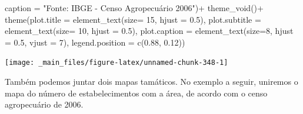 \documentclass[
  brazilian,
]{book}
\newenvironment{Shaded}{\begin{snugshade}}{\end{snugshade}}
\newcommand{\AttributeTok}[1]{\textcolor[rgb]{0.77,0.63,0.00}{#1}}
\newcommand{\DecValTok}[1]{\textcolor[rgb]{0.00,0.00,0.81}{#1}}
\newcommand{\FloatTok}[1]{\textcolor[rgb]{0.00,0.00,0.81}{#1}}
\newcommand{\FunctionTok}[1]{\textcolor[rgb]{0.00,0.00,0.00}{#1}}
\newcommand{\NormalTok}[1]{#1}
\newcommand{\SpecialCharTok}[1]{\textcolor[rgb]{0.00,0.00,0.00}{#1}}
\newcommand{\StringTok}[1]{\textcolor[rgb]{0.31,0.60,0.02}{#1}}
\begin{document}
\begin{Shaded}
\begin{Highlighting}[]
       \AttributeTok{caption =} \StringTok{"Fonte: IBGE {-} Censo Agropecuário 2006"}\NormalTok{)}\SpecialCharTok{+}
  \FunctionTok{theme\_void}\NormalTok{()}\SpecialCharTok{+}
  \FunctionTok{theme}\NormalTok{(}\AttributeTok{plot.title =} \FunctionTok{element\_text}\NormalTok{(}\AttributeTok{size=} \DecValTok{15}\NormalTok{, }\AttributeTok{hjust =} \FloatTok{0.5}\NormalTok{),}
        \AttributeTok{plot.subtitle =} \FunctionTok{element\_text}\NormalTok{(}\AttributeTok{size=} \DecValTok{10}\NormalTok{, }\AttributeTok{hjust =} \FloatTok{0.5}\NormalTok{),}
        \AttributeTok{plot.caption =} \FunctionTok{element\_text}\NormalTok{(}\AttributeTok{size=}\DecValTok{8}\NormalTok{, }\AttributeTok{hjust =} \FloatTok{0.5}\NormalTok{, }\AttributeTok{vjust =} \DecValTok{7}\NormalTok{),}
        \AttributeTok{legend.position =} \FunctionTok{c}\NormalTok{(}\FloatTok{0.88}\NormalTok{, }\FloatTok{0.12}\NormalTok{))}
\end{Highlighting}
\end{Shaded}

\begin{center}\texttt{[image: \_main\_files/figure-latex/unnamed-chunk-348-1]} \end{center}

Também podemos juntar dois mapas tamáticos. No exemplo a seguir, uniremos o mapa do número de estabelecimentos com a área, de acordo com o censo agropecuário de 2006.
\end{document}
